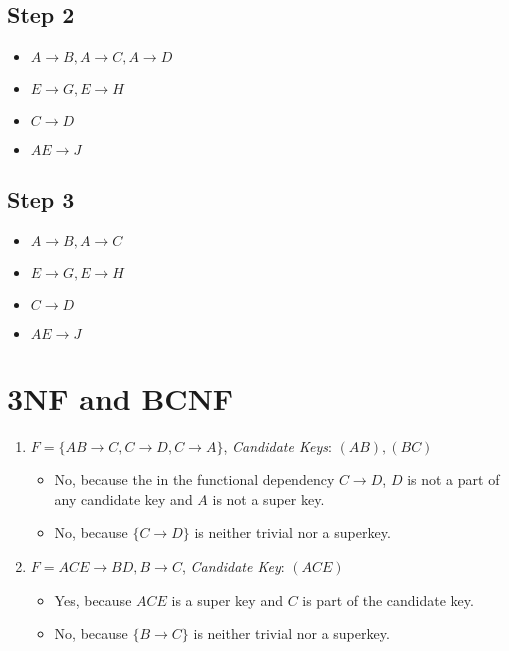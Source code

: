 \documentclass{scrartcl}
\begin{document}
\subsection*{Step 2}
\begin{itemize}
    \item $A \rightarrow B, A \rightarrow C, A \rightarrow D$
    \item $E \rightarrow G, E \rightarrow H$
    \item $C \rightarrow D$
    \item $AE \rightarrow J$
\end{itemize}

\subsection*{Step 3}
\begin{itemize}
    \item $A \rightarrow B, A \rightarrow C$
    \item $E \rightarrow G, E \rightarrow H$
    \item $C \rightarrow D$
    \item $AE \rightarrow J$
\end{itemize}

\section{3NF and BCNF}
\begin{enumerate}
    \item  $F = \{ AB \rightarrow C, C \rightarrow D, C \rightarrow A \}$, \textit{Candidate Keys}: $(AB), (BC)$
    \begin{itemize}
        \item No, because the in the functional dependency $C \rightarrow D$, $D$ is not a part of any candidate key and $A$ is not a super key.
        \item No, because $\{ C \rightarrow D \}$ is neither trivial nor a superkey.
    \end{itemize}
    \item $F = {ACE \rightarrow BD, B \rightarrow C}$, \textit{Candidate Key}: $(ACE)$
    \begin{itemize}
        \item Yes, because $ACE$ is a super key and $C$ is part of the candidate key.
        \item No, because $\{B \rightarrow C \}$ is neither trivial nor a superkey.
    \end{itemize}
\end{enumerate}
\end{document}
